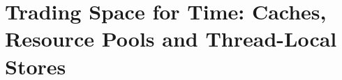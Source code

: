 \chapter{Trading Space for Time: Caches, Resource Pools and Thread-Local Stores}
\label{chapter:trading-space-for-time}
